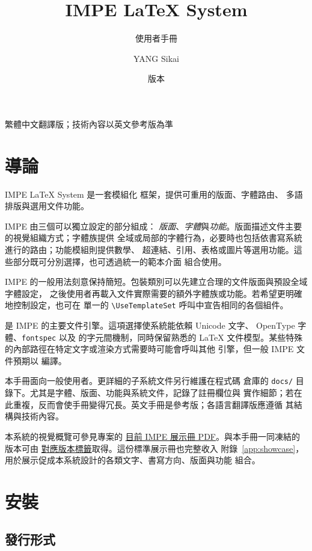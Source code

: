 \documentclass[11pt,lang=zh]{impeart}
\title{IMPE \LaTeX{} System}
\subtitle{使用者手冊}
\author{YANG Sikai}
\date{版本 \IMPEVersion}
\newcommand{\IMPEShowcaseURL}{https://github.com/KelvinYangBK67/IMPE-LaTeX-System/blob/main/manual/showcase/impe-showcase.pdf}
\newcommand{\IMPETaggedShowcaseURL}{https://github.com/KelvinYangBK67/IMPE-LaTeX-System/blob/v\IMPEVersion/manual/showcase/impe-showcase.pdf}
\begin{document}
\maketitle

\begin{center}
\small 繁體中文翻譯版；技術內容以英文參考版為準
\end{center}

\tableofcontents

\section{導論}

IMPE \LaTeX{} System 是一套模組化 \XeLaTeX{} 框架，提供可重用的版面、字體路由、
多語排版與選用文件功能。

IMPE 由三個可以獨立設定的部分組成：
\emph{版面}、\emph{字體}與\emph{功能}。版面描述文件主要的視覺組織方式；字體族提供
全域或局部的字體行為，必要時也包括依書寫系統進行的路由；功能模組則提供數學、
超連結、引用、表格或圖片等選用功能。這些部分既可分別選擇，也可透過統一的範本介面
組合使用。

IMPE 的一般用法刻意保持簡短。包裝類別可以先建立合理的文件版面與預設全域字體設定，
之後使用者再載入文件實際需要的額外字體族或功能。若希望更明確地控制設定，也可在
單一的 \verb|\UseTemplateSet| 呼叫中宣告相同的各個組件。

\XeLaTeX{} 是 IMPE 的主要文件引擎。這項選擇使系統能依賴 Unicode 文字、
OpenType 字體、\texttt{fontspec} 以及 \XeTeX{} 的字元間機制，同時保留熟悉的
\LaTeX{} 文件模型。某些特殊的內部路徑在特定文字或渲染方式需要時可能會呼叫其他
引擎，但一般 IMPE 文件預期以 \XeLaTeX{} 編譯。

本手冊面向一般使用者。更詳細的子系統文件另行維護在程式碼
倉庫的 \texttt{docs/} 目錄下。尤其是字體、版面、功能與系統文件，記錄了註冊欄位與
實作細節；若在此重複，反而會使手冊變得冗長。英文手冊是參考版；各語言翻譯版應遵循
其結構與技術內容。

本系統的視覺概覽可參見專案的
\href{\IMPEShowcaseURL}{目前 IMPE 展示冊 PDF}。與本手冊一同凍結的版本可由
\href{\IMPETaggedShowcaseURL}{對應版本標籤}取得。這份標準展示冊也完整收入
附錄~\ref{app:showcase}，用於展示促成本系統設計的各類文字、書寫方向、版面與功能
組合。

\section{安裝}

\subsection{發行形式}
\end{document}
